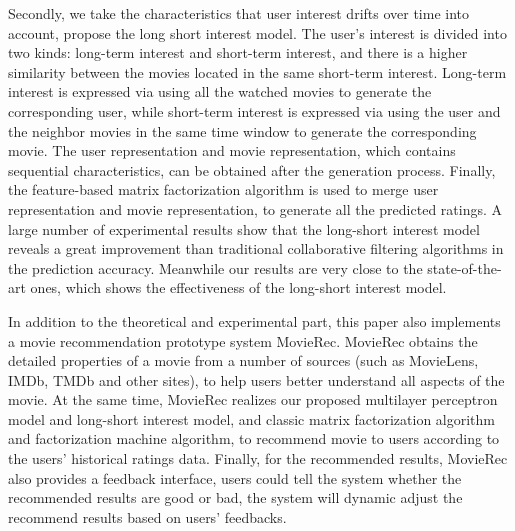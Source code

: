\begin{eabstract}
Secondly, we take the characteristics that user interest drifts over time into account, propose the long short interest model.
The user's interest is divided into two kinds: long-term interest and short-term interest,
and there is a higher similarity between the movies located in the same short-term interest.
Long-term interest is expressed via using all the watched movies to generate the corresponding user,
while short-term interest is expressed via using the user and the neighbor movies
in the same time window to generate the corresponding movie.
The user representation and movie representation, which contains sequential characteristics,
can be obtained after the generation process.
Finally, the feature-based matrix factorization algorithm is used to merge user representation and movie representation,
to generate all the predicted ratings.
A large number of experimental results show that the long-short interest model reveals a great improvement
than traditional collaborative filtering algorithms in the prediction accuracy.
Meanwhile our results are very close to the state-of-the-art ones,
which shows the effectiveness of the long-short interest model.

In addition to the theoretical and experimental part, this paper also implements a movie recommendation prototype system MovieRec. MovieRec obtains the detailed properties of a movie from a number of sources (such as MovieLens, IMDb, TMDb and other sites),
to help users better understand all aspects of the movie.
At the same time, MovieRec realizes our proposed multilayer perceptron model and long-short interest model,
and classic matrix factorization algorithm and factorization machine algorithm,
to recommend movie to users according to the users' historical ratings data.
Finally, for the recommended results, MovieRec also provides a feedback interface,
users could tell the system whether the recommended results are good or bad,
the system will dynamic adjust the recommend results based on users' feedbacks.
\end{eabstract}


